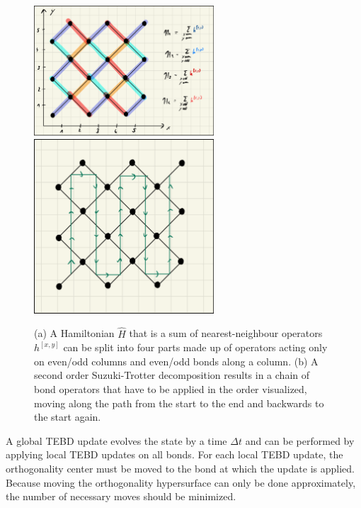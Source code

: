 \begin{figure}
	\centering
	\subcaptionbox{\label{fig:disoTPS_TEBD_global_update_TEBD1_splitting}}
	{%
		\includegraphics[width=0.6\textwidth]{figures/disoTPS/disoTPS_TEBD_global_update_TEBD1_splitting.jpeg}
	}
	\subcaptionbox{\label{fig:disoTPS_TEBD_global_update_TEBD2_chain}}
	{%
		\includegraphics[width=0.6\textwidth]{figures/disoTPS/disoTPS_TEBD_global_update_TEBD2_chain.jpeg}
	}
	\caption{(a) A Hamiltonian $\hat{H}$ that is a sum of nearest-neighbour operators $h^{[x,y]}$ can be split into four parts made up of operators acting only on even/odd columns and even/odd bonds along a column. (b) A second order Suzuki-Trotter decomposition results in a chain of bond operators that have to be applied in the order visualized, moving along the path from the start to the end and backwards to the start again.}
	\label{fig:disoTPS_TEBD_global_update_TEBD1_splitting_and_TEBD2_chain}
\end{figure}
A global TEBD update evolves the state by a time $\Delta t$ and can be performed by applying local TEBD updates on all bonds. For each local TEBD update, the orthogonality center must be moved to the bond at which the update is applied. Because moving the orthogonality hypersurface can only be done approximately, the number of necessary moves should be minimized. \par
